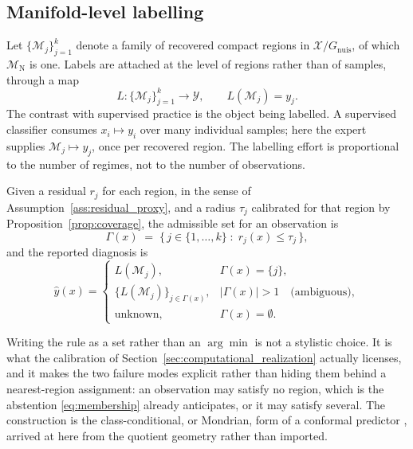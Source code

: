 \documentclass[a4paper]{cas-sc}
\newcommand{\Mnominal}{\ensuremath{\mathcal{M}_{\mathrm{N}}}}
\newcommand{\quotient}{\ensuremath{\mathcal{X}/G_{\mathrm{nuis}}}}
\newcommand{\residual}{\ensuremath{r}}
\begin{document}
\subsection{Manifold-level labelling}
\label{subsec:manifold_labelling}

Let \(\{\mathcal{M}_j\}_{j=1}^{k}\) denote a family of recovered compact
regions in \(\quotient\), of which \(\Mnominal\) is one. Labels are attached
at the level of regions rather than of samples, through a map
\begin{equation}
L:\{\mathcal{M}_j\}_{j=1}^{k}\longrightarrow \mathcal{Y},
\qquad L(\mathcal{M}_j)=y_j .
\label{eq:labelling_map}
\end{equation}
The contrast with supervised practice is the object being labelled. A
supervised classifier consumes \(x_i\mapsto y_i\) over many individual
samples; here the expert supplies \(\mathcal{M}_j\mapsto y_j\), once per
recovered region. The labelling effort is proportional to the number of
regimes, not to the number of observations.

Given a residual \(\residual_j\) for each region, in the sense of
Assumption~\ref{ass:residual_proxy}, and a radius \(\tau_j\) calibrated for
that region by Proposition~\ref{prop:coverage}, the admissible set for an
observation is
\begin{equation}
\Gamma(x) \;=\; \bigl\{\, j \in \{1,\ldots,k\} \;:\; \residual_j(x)\le\tau_j \,\bigr\},
\label{eq:admissible_set}
\end{equation}
and the reported diagnosis is
\begin{equation}
\hat y(x)=
\begin{cases}
L(\mathcal{M}_j), & \Gamma(x)=\{j\},\\[2pt]
\{L(\mathcal{M}_j)\}_{j\in\Gamma(x)}, & |\Gamma(x)|>1 \quad\text{(ambiguous)},\\[2pt]
\mathrm{unknown}, & \Gamma(x)=\emptyset .
\end{cases}
\label{eq:set_valued_rule}
\end{equation}

Writing the rule as a set rather than an \(\arg\min\) is not a stylistic
choice. It is what the calibration of
Section~\ref{sec:computational_realization} actually licenses, and it makes
the two failure modes explicit rather than hiding them behind a nearest-region
assignment: an observation may satisfy no region, which is the abstention
\eqref{eq:membership} already anticipates, or it may satisfy several. The
construction is the class-conditional, or Mondrian, form of a conformal
predictor \citep{vovk2005,shafer2008}, arrived at here from the quotient
geometry rather than imported.
\end{document}
